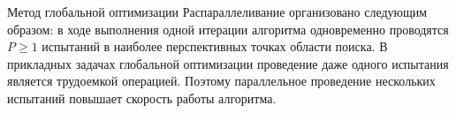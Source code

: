 \documentclass{beamer}
\begin{document}
\begin{frame}[t]
\begin{columns}[t]
\begin{column}[t]{0.465\paperwidth}
\begin{block}{Метод глобальной оптимизации}
Распараллеливание организовано следующим образом: в ходе выполнения одной итерации алгоритма одновременно проводятся \(P \geq 1\) испытаний в наиболее перспективных точках области поиска. В прикладных задачах глобальной оптимизации проведение даже одного испытания является трудоемкой операцией. Поэтому параллельное проведение нескольких испытаний повышает скорость работы алгоритма. 

\leftskip=0.001cm 
\setlength{\parindent}{0.001cm}
 \begin{minipage}[t]{0.96\textwidth}
              \begin{figure}
              \end{figure}
              \end{minipage}
\end{block}
            

\end{column}
\end{columns}
\end{frame}
\end{document}
